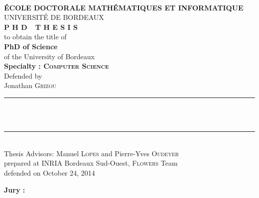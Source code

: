 
\begin{titlepage}
\begin{center}
 \\
\vspace*{0.3cm}
\noindent \textbf{\'ECOLE DOCTORALE MATH\'EMATIQUES ET INFORMATIQUE} \\
\noindent UNIVERSIT\'E DE BORDEAUX \\
\vspace*{0.5cm}
\noindent \Huge \textbf{P H D\ \ T H E S I S} \\
\vspace*{0.3cm}
\noindent \large {to obtain the title of} \\
\vspace*{0.3cm}
\noindent \LARGE \textbf{PhD of Science} \\
\vspace*{0.3cm}
\noindent \Large of the University of Bordeaux \\
\noindent \Large \textbf{Specialty : \textsc{Computer Science}}\\
\vspace*{0.4cm}
\noindent \large {Defended by\\}
\noindent \LARGE Jonathan \textsc{Grizou} \\
\vspace*{0.4cm}
\noindent\rule{10cm}{0.4pt}\\
\vspace*{0.4cm}
\noindent {\huge \textbf{\thesistitle}} \\
\vspace*{0.4cm}
\noindent\rule{10cm}{0.4pt}\\
\vspace*{0.4cm}
\noindent \Large Thesis Advisors: Manuel \textsc{Lopes} and Pierre-Yves \textsc{Oudeyer} \\
\vspace*{0.2cm}
\noindent \Large prepared at INRIA Bordeaux Sud-Ouest, \textsc{Flowers} Team\\
\vspace*{0.2cm}
\noindent \large defended on October 24, 2014 \\
\vspace*{0.5cm}
\end{center}
\noindent \large \textbf{Jury :} \\
\begin{center}
\noindent \large 
\begin{tabular}{llcclr}

\end{tabular}
\end{center}
\end{titlepage}
